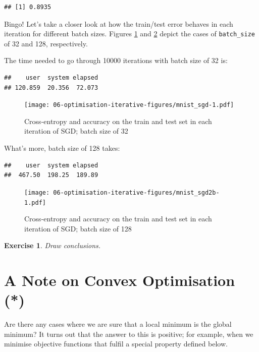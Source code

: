 \documentclass[10pt,b5paper,krantz1]{krantz}
\newtheorem{exercise}{Exercise}[chapter]
\begin{document}
\begin{verbatim}
## [1] 0.8935
\end{verbatim}

Bingo! Let's take a closer look at how the train/test error
behaves in each iteration for different batch sizes.
Figures \ref{fig:mnist_sgd} and \ref{fig:mnist_sgd2b} depict
the cases of \texttt{batch\_size} of 32 and 128, respectively.

The time needed to go through 10000 iterations with batch size of 32 is:

\begin{verbatim}
##    user  system elapsed 
## 120.859  20.356  72.073
\end{verbatim}

\begin{figure}
\hypertarget{fig:mnist_sgd}{%
\centering
\texttt{[image: 06-optimisation-iterative-figures/mnist\_sgd-1.pdf]}
\caption{Cross-entropy and accuracy on the train and test set in each iteration of SGD; batch size of 32}\label{fig:mnist_sgd}
}
\end{figure}

What's more, batch size of 128 takes:

\begin{verbatim}
##    user  system elapsed 
##  467.50  198.25  189.89
\end{verbatim}

\begin{figure}
\hypertarget{fig:mnist_sgd2b}{%
\centering
\texttt{[image: 06-optimisation-iterative-figures/mnist\_sgd2b-1.pdf]}
\caption{Cross-entropy and accuracy on the train and test set in each iteration of SGD; batch size of 128}\label{fig:mnist_sgd2b}
}
\end{figure}

\begin{exercise}

Draw conclusions.

\end{exercise}

\hypertarget{a-note-on-convex-optimisation}{%
\section{A Note on Convex Optimisation (*)}\label{a-note-on-convex-optimisation}}

Are there any cases where we are sure that
a local minimum is the global minimum?
It turns out that the answer to this is positive;
for example, when we minimise objective functions
that fulfil a special property defined below.
\end{document}

